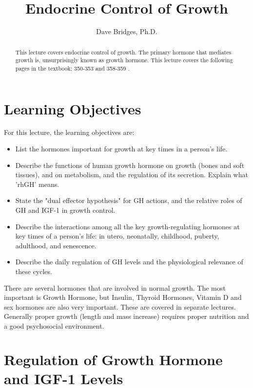 \documentclass{tufte-handout}
\title{Endocrine Control of Growth}
\author{Dave Bridges, Ph.D.}
\begin{document}
\maketitle%

\begin{abstract}
\noindent This lecture covers endocrine control of growth.  The primary hormone that mediates growth is, unsurprisingly known as growth hormone.  This lecture covers the following pages in the textbook: 350-353 and 358-359 \cite{Widmaier2013}.
\end{abstract}

\tableofcontents

\pagebreak

\section{Learning Objectives}
For this lecture, the learning objectives are:
\begin{itemize}
\item List the hormones important for growth at key times in a person's life.
\item Describe the functions of human growth hormone on growth (bones and soft tissues), and on metabolism, and the regulation of its secretion.  Explain what 'rhGH' means.
\item State the "dual effector hypothesis" for GH actions, and the relative roles of GH and IGF-1 in growth control. 
\item Describe the interactions among all the key growth-regulating hormones at key times of a person's life: in utero, neonatally, childhood, puberty, adulthood, and senescence.
\item Describe the daily regulation of GH levels and the physiological relevance of these cycles.

\end{itemize}

There are several hormones that are involved in normal growth.  The most important is Growth Hormone, but Insulin, Thyroid Hormones, Vitamin D and sex hormones are also very important.  These are covered in separate lectures.  Generally proper growth (length and mass increase) requires proper nutrition and a good psychosocial environment.  

\section{Regulation of Growth Hormone and IGF-1 Levels}
\end{document}
